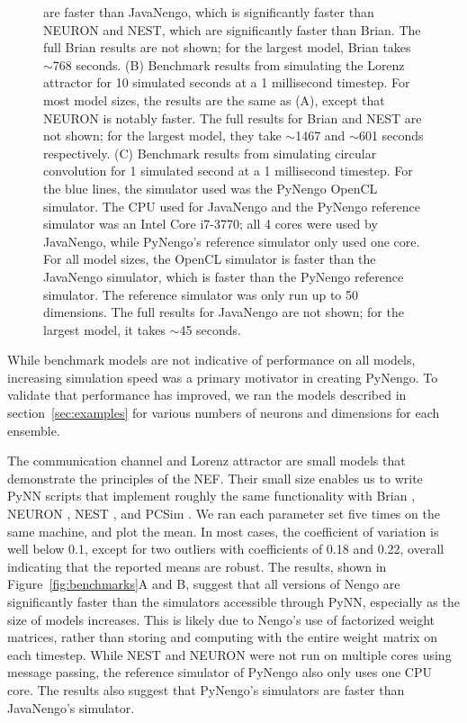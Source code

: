 \documentclass{frontiersSCNS}
\begin{document}
\begin{figure}
{     are faster than JavaNengo,
     which is significantly faster than NEURON and NEST,
     which are significantly faster than Brian.
     The full Brian results are not shown;
     for the largest model, Brian takes $\sim$768 seconds.
     (B) Benchmark results from simulating
     the Lorenz attractor for 10 simulated seconds
     at a 1 millisecond timestep.
     For most model sizes,
     the results are the same as (A),
     except that NEURON is notably faster.
     The full results for Brian and NEST are not shown;
     for the largest model, they take $\sim$1467
     and $\sim$601 seconds respectively.
     (C) Benchmark results from simulating
     circular convolution for 1 simulated second
     at a 1 millisecond timestep.
     For the blue lines, the simulator used
     was the PyNengo OpenCL simulator.
     The CPU used for JavaNengo and
     the PyNengo reference simulator
     was an Intel Core i7-3770;
     all 4 cores were used by JavaNengo,
     while PyNengo's reference simulator
     only used one core.
     For all model sizes,
     the OpenCL simulator is faster
     than the JavaNengo simulator,
     which is faster than the PyNengo
     reference simulator.
     The reference simulator was only run
     up to 50 dimensions.
     The full results for JavaNengo
     are not shown; for the largest model,
     it takes $\sim$45 seconds.
     }
\end{figure}

While benchmark models are not indicative
of performance on all models,
increasing simulation speed
was a primary motivator in creating PyNengo.
To validate that performance has improved,
we ran the models described in section~\ref{sec:examples}
for various numbers of neurons and dimensions
for each ensemble.

The communication channel and Lorenz attractor
are small models that demonstrate
the principles of the NEF.
Their small size enables us to write
PyNN scripts that implement roughly
the same functionality
with Brian \citep{goodman2009}, NEURON \citep{hines2009},
NEST \citep{eppler2008}, and PCSim \citep{pecevski2009}.
We ran each parameter set five times
on the same machine,
and plot the mean.
In most cases, the coefficient of variation
is well below 0.1, except for two
outliers with coefficients of 0.18 and 0.22,
overall indicating that the reported means are robust.
The results, shown in Figure~\ref{fig:benchmarks}A and B,
suggest that all versions of Nengo are significantly
faster than the simulators accessible
through PyNN, especially
as the size of models increases.
This is likely due to Nengo's
use of factorized weight matrices,
rather than storing and computing with
the entire weight matrix
on each timestep.
While NEST and NEURON were not
run on multiple cores using message passing,
the reference simulator of PyNengo
also only uses one CPU core.
The results also suggest that PyNengo's
simulators are faster than JavaNengo's simulator.
\end{document}
